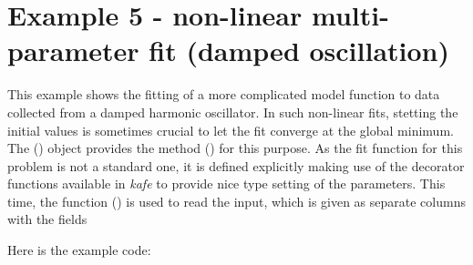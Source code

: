 \documentclass[a4paper,10pt,english]{sphinxmanual}
\begin{document}
\section{Example 5 - non-linear multi-parameter fit (damped oscillation)}
\label{examples:example-5-non-linear-multi-parameter-fit-damped-oscillation}
This example shows the fitting of a more complicated model function
to data collected from a damped harmonic oscillator. In such
non-linear fits, stetting the initial values is sometimes crucial
to let the fit converge at the global minimum. The {\hyperref[module_doc:kafe.fit.Fit]{\emph{}}} ()
object provides the method {\hyperref[module_doc:kafe.fit.Fit.set_parameters]{\emph{}}} () for this
purpose. As the fit function for this problem is not a standard one, it is
defined explicitly making use of the decorator functions available in
\emph{kafe} to provide nice type setting of the parameters. This time,
the function {\hyperref[module_doc:kafe.file_tools.parse_column_data]{\emph{}}} () is used to read
the input, which is given as separate columns with the fields
\begin{quote}

\end{quote}

Here is the example code:
\end{document}
